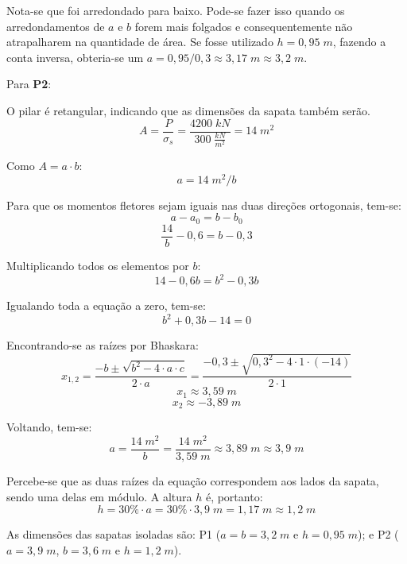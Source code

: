 Nota-se que foi arredondado para baixo. Pode-se fazer isso quando os arredondamentos de $a$ e $b$ forem mais folgados e consequentemente não atrapalharem na quantidade de área. Se fosse utilizado $h=0,95\;m$, fazendo a conta inversa, obteria-se um $a=0,95/0,3\approx3,17\;m\approx3,2\;m$.

Para \textbf{P2}:

O pilar é retangular, indicando que as dimensões da sapata também serão.
$$A=\frac{P}{\sigma_s}=\frac{4200\;kN}{300\;\frac{kN}{m^2}}=14\;m^2$$

Como $A=a\cdot b$:
$$a=14\;m^2/b$$

Para que os momentos fletores sejam iguais nas duas direções ortogonais, tem-se:
$$a-a_0=b-b_0$$
$$\frac{14}{b}-0,6=b-0,3$$

Multiplicando todos os elementos por $b$:
$$14-0,6b=b^2-0,3b$$

Igualando toda a equação a zero, tem-se:
$$b^2+0,3b-14=0$$

Encontrando-se as raízes por Bhaskara:
$$x_{1, 2}=\frac{-b\pm\sqrt{b^2-4\cdot a\cdot c}}{2\cdot a}=\frac{-0,3\pm\sqrt{0,3^2-4\cdot 1\cdot (-14)}}{2\cdot1}$$
$$x_1\approx3,59\;m$$
$$x_2\approx-3,89\;m$$

Voltando, tem-se:
$$a=\frac{14\;m^2}{b}=\frac{14\;m^2}{3,59\;m}\approx3,89\;m\approx3,9\;m$$

Percebe-se que as duas raízes da equação correspondem aos lados da sapata, sendo uma delas em módulo. A altura $h$ é, portanto:
$$h=30\%\cdot a=30\%\cdot 3,9\;m=1,17\;m\approx1,2\;m$$

As dimensões das sapatas isoladas são: P1 ($a=b=3,2\;m$ e $h=0,95\;m$); e P2 ($a=3,9\;m$, $b=3,6\;m$ e $h=1,2\;m$).